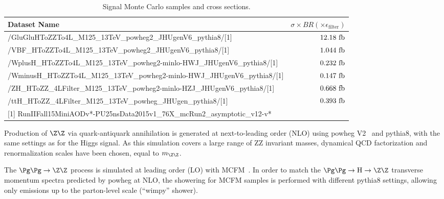 \begin{table}
\begin{scriptsize}
    \centering
    \begin{tabular}{|l|r|}
   \hline
  Dataset Name & $\sigma\times BR (\times\epsilon_{\text{filter}})$ \\ \hline
  /GluGluHToZZTo4L\_M125\_13TeV\_powheg2\_JHUgenV6\_pythia8/[1] & $12.18~\rm{fb}$ \\ %
  /VBF\_HToZZTo4L\_M125\_13TeV\_powheg2\_JHUgenV6\_pythia8/[1] & $1.044~\rm{fb}$ \\ %
  /WplusH\_HToZZTo4L\_M125\_13TeV\_powheg2-minlo-HWJ\_JHUgenV6\_pythia8/[1] & $0.232~\rm{fb}$ \\ %
  /WminusH\_HToZZTo4L\_M125\_13TeV\_powheg2-minlo-HWJ\_JHUgenV6\_pythia8/[1] & $0.147~\rm{fb}$ \\ %
  /ZH\_HToZZ\_4LFilter\_M125\_13TeV\_powheg2-minlo-HZJ\_JHUgenV6\_pythia8/[1] & $0.668~\rm{fb}$ \\ %
 /ttH\_HToZZ\_4LFilter\_M125\_13TeV\_powheg\_JHUgen\_pythia8/[1] & $0.393~\rm{fb}$ \\ %
 \hline
 \multicolumn{3}{l}{[1] RunIIFall15MiniAODv*-PU25nsData2015v1\_76X\_mcRun2\_asymptotic\_v12-v*}\\
 \end{tabular}
 \caption{Signal Monte Carlo samples and cross sections.}
  \label{tab:SignalSamples}
\end{scriptsize}
\end{table}

Production of $\Z\Z$ via quark-antiquark annihilation is generated at
next-to-leading order (NLO) using {\sc powheg V2}~\cite{Nason:2013ydw}
and {\sc pythia8}, with
the same settings as for the Higgs signal. As this simulation covers a large
range of ZZ invariant masses, dynamical QCD factorization and renormalization
scales have been chosen, equal to $m_{\Z\Z}$.

The $\Pg\Pg \to \Z\Z$ process is simulated at leading order (LO)
with MCFM~\cite{MCFM,Campbell:2013una}. In order to match the
$\Pg\Pg \to \mathrm{H} \to \Z\Z$ transverse momentum spectra predicted
by {\sc powheg} at NLO, the showering for MCFM samples is performed with
different {\sc pythia8} settings, allowing only emissions up to the parton-level scale
(``wimpy'' shower).

